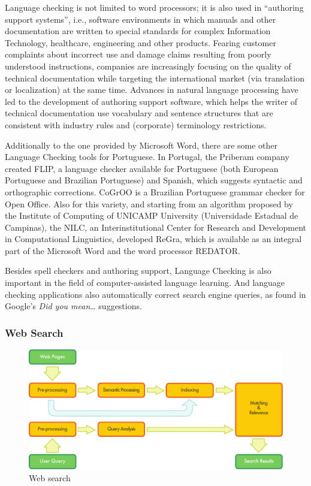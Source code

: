 \documentclass[]{../metanetpaper}
\begin{document}
\begin{multicols}{2}
 Language checking is not limited to word processors; it is also used in “authoring support systems”, i.e., software environments in which manuals and other documentation are written to special standards for complex Information Technology, healthcare, engineering and other products. Fearing customer complaints about incorrect use and damage claims resulting from poorly understood instructions, companies are increasingly focusing on the quality of technical documentation while targeting the international market (via translation or localization) at the same time. Advances in natural language processing have led to the development of authoring support software, which helps the writer of technical documentation use vocabulary and sentence structures that are consistent with industry rules and (corporate) terminology restrictions.

   Additionally to the one provided by Microsoft Word, there are some other Language Checking tools for Portuguese. In Portugal, the Priberam company created FLIP, a language checker available for Portuguese (both European Portuguese and Brazilian Portuguese) and Spanish, which suggests syntactic and orthographic corrections. CoGrOO is a Brazilian Portuguese grammar checker for Open Office. Also for this variety, and starting from an algorithm proposed by the Institute of Computing of UNICAMP University (Universidade Estadual de Campinas), the NILC, an Interinstitutional Center for Research and Development in Computational Linguistics, developed ReGra, which is available as an integral part of the Microsoft Word and the word processor REDATOR. 

Besides spell checkers and authoring support, Language Checking is also important in the field of computer-assisted language learning. And language checking applications also automatically correct search engine queries, as found in Google's \textit{Did you mean}… suggestions.

\subsubsection{Web Search}

\begin{figure}[htb]
  \center
  \includegraphics[width=\textwidth]{../_media/english/web_search_architecture}
  \caption{Web search}
  \label{fig:websearcharch_en}
 \end{figure}


\end{multicols}
\end{document}

